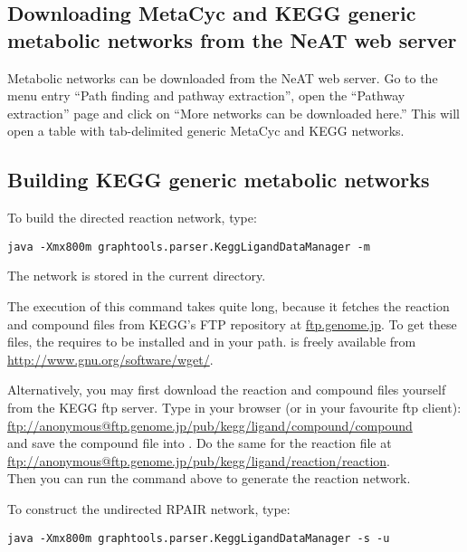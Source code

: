 \subsection{Downloading MetaCyc and KEGG generic metabolic networks from the
NeAT web server}\label{Download}

Metabolic networks can be downloaded from the NeAT web server.
Go to the menu entry ``Path finding and pathway extraction'', open the
``Pathway extraction'' page and click on ``More networks can be downloaded
here.'' This will open a table with tab-delimited generic MetaCyc and KEGG
networks.

\subsection{Building KEGG generic metabolic networks} 

To build the directed reaction network, type:

\begin{verbatim}
java -Xmx800m graphtools.parser.KeggLigandDataManager -m
\end{verbatim}

The network is stored in the current directory.

The execution of this command takes quite long, because it fetches the reaction
and compound files from KEGG's FTP repository at \url{ftp.genome.jp}. 
To get these files, the  requires
 to be installed and in your path.  is 
freely available from \url{http://www.gnu.org/software/wget/}.

Alternatively, you may first download the reaction and compound files yourself
from the KEGG ftp server. Type in your browser (or in your favourite ftp
client):\\
\url{ftp://anonymous@ftp.genome.jp/pub/kegg/ligand/compound/compound}\\
and save the compound file into \RSAT{}. Do the same
for the reaction file at\\
\url{ftp://anonymous@ftp.genome.jp/pub/kegg/ligand/reaction/reaction}.\\ 
Then you can run the command above to generate the reaction network.

\label{RPAIR}
To construct the undirected RPAIR network, type:

\begin{verbatim}
java -Xmx800m graphtools.parser.KeggLigandDataManager -s -u
\end{verbatim}

